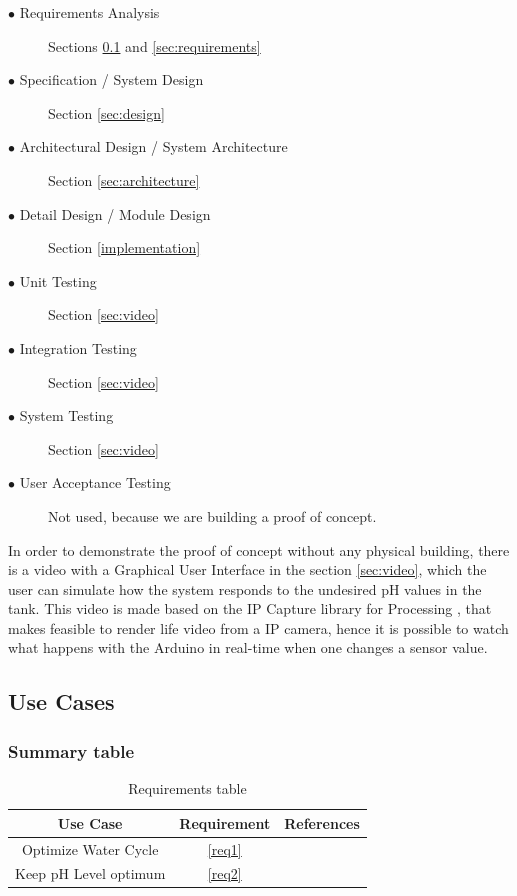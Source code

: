 \begin{description}
    \item[$\bullet$ Requirements Analysis] Sections \ref{sec:useCases} and \ref{sec:requirements}
    \item[$\bullet$ Specification / System Design] Section \ref{sec:design}
    \item[$\bullet$ Architectural Design / System Architecture] Section  \ref{sec:architecture}
    \item[$\bullet$ Detail Design / Module Design] Section \ref{implementation}
    \item[$\bullet$ Unit Testing] Section \ref{sec:video}
    \item[$\bullet$ Integration Testing] Section \ref{sec:video}
    \item[$\bullet$ System Testing] Section \ref{sec:video}
    \item[$\bullet$ User Acceptance Testing] Not used, because we are building a proof of concept.
\end{description}


In order to demonstrate the proof of concept without any physical building,
there is a video with a Graphical User Interface in the section \ref{sec:video},
which the user can simulate how the system responds to the undesired pH values in the tank.
This video is made based on the IP Capture library for Processing \cite{ipcapture_2016},
that makes feasible to render life video from a IP camera,
hence it is possible to watch what happens with the Arduino in real-time when one changes a sensor value.

\subsection{Use Cases}
\label{sec:useCases}

\newpage


\subsubsection{Summary table}

\begin{table}[h]
\centering
\caption{Requirements table}
\label{tab:requirementsTable}
\begin{tabular}{|c|c|c|}
\hline
\textbf{Use Case}    & \textbf{Requirement} & \textbf{References} \\ \hline
Optimize Water Cycle & \ref{req1}           &                 \\ \hline
Keep pH Level optimum & \ref{req2}           &  \cite{tables} \\ \hline
\end{tabular}
\end{table}

